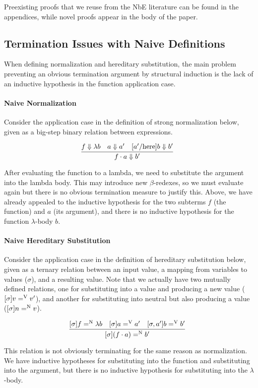 \documentclass[runningheads,a4paper]{llncs}
\def\bigstep{\Downarrow}
\def\app{\cdot}
\def\lam{\lambda}
\newcommand{\hsubn}[2]{[\sigma]#1=^\con{N}#2}
\newcommand{\hsub}[2]{[\sigma]#1=^\con{V}#2}
\newcommand{\hsubext}[3]{[\sigma, #1]#2=^\con{V}#3}
\newcommand{\con}[1]{\textmd{#1}}
\begin{document}
Preexisting proofs that we reuse from the NbE literature can be found
in the appendices, while novel proofs appear in the body of the paper.

\subsection{Termination Issues with Naive Definitions}

When defining normalization and hereditary substitution, the
main problem preventing an obvious termination
argument by structural induction is the lack of
an inductive hypothesis in the function application case.

\paragraph{Naive Normalization}
Consider the application case in the definition of strong normalization
below, given as a big-step binary relation between expressions.

$$
\infer
  []{f \app a \bigstep {b'}}
{
  f \bigstep \lam b
  &
  a \bigstep a'
  &
  [a'/\con{here}]b \bigstep b'
}
$$

After evaluating the function to a lambda, we need to
substitute the argument into the lambda body. This may introduce
new $\beta$-redexes, so we must evaluate again but
there is no obvious termination measure to justify this. Above, we have
already appealed to the inductive hypothesis for the two subterms $f$
(the function) and $a$ (its argument), and there is no inductive
hypothesis for the function $\lambda$-body $b$. 

\paragraph{Naive Hereditary Substitution}
Consider the application case in the definition of hereditary substitution
below, given as a ternary relation between an input value, a mapping from
variables to values ($\sigma$), and a resulting value. Note that we
actually have two mutually defined relations, one for substituting
into a value and producing a new value ($\hsub{v}{v'}$), and another
for substituting into neutral but also producing a value
($\hsubn{n}{v}$).

$$
\infer
   []{\hsubn{(f \app a)}{b'}}
{
  \hsubn{f}{\lam b}
  &
  \hsub{a}{a'}
  &
  \hsubext{a'}{b}{b'}
}
$$

This relation is not obviously terminating for the same reason as
normalization. We have inductive hypotheses for substituting into the
function and substituting into the argument, but there is no inductive hypothesis for
substituting into the $\lambda$-body.
\end{document}
